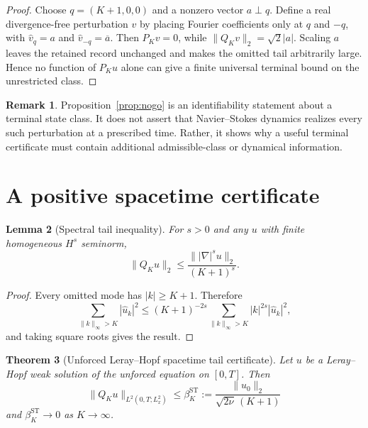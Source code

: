 \documentclass[11pt]{article}
\newtheorem{theorem}{Theorem}
\newtheorem{lemma}[theorem]{Lemma}
\theoremstyle{definition}
\newtheorem{remark}[theorem]{Remark}
\begin{document}
\begin{proof}
Choose $q=(K+1,0,0)$ and a nonzero vector $a\perp q$.  Define a real divergence-free perturbation
$v$ by placing Fourier coefficients only at $q$ and $-q$, with
$\widehat v_q=a$ and $\widehat v_{-q}=\overline a$.  Then $P_Kv=0$, while
$\|Q_Kv\|_2=\sqrt{2}|a|$.  Scaling $a$ leaves the retained record unchanged and makes the omitted
tail arbitrarily large.  Hence no function of $P_Ku$ alone can give a finite universal terminal
bound on the unrestricted class.
\end{proof}

\begin{remark}
Proposition~\ref{prop:nogo} is an identifiability statement about a terminal state class.  It does
not assert that Navier--Stokes dynamics realizes every such perturbation at a prescribed time.
Rather, it shows why a useful terminal certificate must contain additional admissible-class or
dynamical information.
\end{remark}

\section{A positive spacetime certificate}

\begin{lemma}[Spectral tail inequality]\label{lem:spectral}
For $s>0$ and any $u$ with finite homogeneous $H^s$ seminorm,
\begin{equation}\label{eq:Hs}
\|Q_Ku\|_2
\le \frac{\||\nabla|^s u\|_2}{(K+1)^s}.
\end{equation}
\end{lemma}

\begin{proof}
Every omitted mode has $|k|\ge K+1$.  Therefore
\[
\sum_{\|k\|_\infty>K}|\widehat u_k|^2
\le (K+1)^{-2s}
\sum_{\|k\|_\infty>K}|k|^{2s}|\widehat u_k|^2,
\]
and taking square roots gives the result.
\end{proof}

\begin{theorem}[Unforced Leray--Hopf spacetime tail certificate]\label{thm:spacetime}
Let $u$ be a Leray--Hopf weak solution of the unforced equation on $[0,T]$.  Then
\begin{equation}\label{eq:spacetime}
\boxed{
\|Q_Ku\|_{L^2(0,T;L^2_x)}
\le
\beta_K^{\mathrm{ST}}
:=\frac{\|u_0\|_2}{\sqrt{2\nu}\,(K+1)}
}
\end{equation}
and $\beta_K^{\mathrm{ST}}\to0$ as $K\to\infty$.
\end{theorem}
\end{document}
